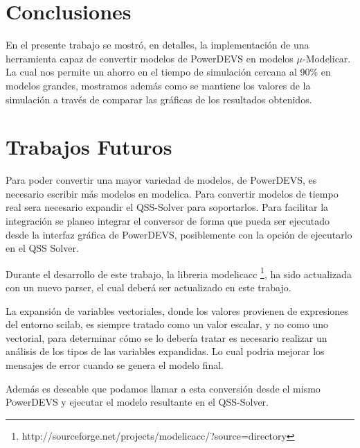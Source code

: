 
\section{Conclusiones}

	En el presente trabajo se mostró, en detalles, la implementación de una herramienta capaz de convertir modelos de PowerDEVS en modelos $\mu$-Modelicar.  
	La cual nos permite un ahorro en el tiempo de simulación cercana al 90\% en modelos grandes, mostramos además como se mantiene los valores de la 
	simulación a través de comparar las gráficas de los resultados obtenidos.

\section{Trabajos Futuros}
	Para poder convertir una mayor variedad de modelos, de PowerDEVS, es necesario escribir más modelos en modelica.
	Para convertir modelos de tiempo real sera necesario expandir el QSS-Solver para soportarlos.
	Para facilitar la integración se planeo integrar el conversor de forma que pueda ser ejecutado desde la interfaz gráfica de PowerDEVS, posiblemente 
	con la opción de ejecutarlo en el QSS Solver.

	Durante el desarrollo de este trabajo, la libreria modelicacc \footnote{http://sourceforge.net/projects/modelicacc/?source=directory}, ha sido actualizada 
	con un nuevo parser, el cual deberá ser actualizado en este trabajo.

	La expansión de variables vectoriales, donde los valores provienen de expresiones del entorno scilab, es siempre tratado como un valor escalar, y no como 
	uno vectorial, para determinar cómo se lo debería tratar es necesario realizar un análisis de los tipos de las variables expandidas. 
	Lo cual podria mejorar los mensajes de error cuando se genera el modelo final.

	Además es deseable que podamos llamar a esta conversión desde el mismo PowerDEVS y ejecutar el modelo resultante en el QSS-Solver.

